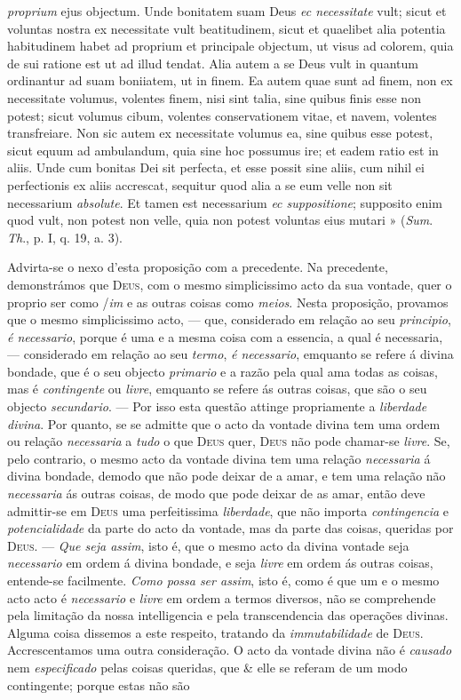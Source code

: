 \emph{proprium} ejus objectum. Unde bonitatem suam Deus \emph{ec necessitate} vult; sicut et voluntas nostra ex necessitate vult beatitudinem, sicut et quaelibet alia potentia habitudinem habet ad proprium et principale objectum, ut visus ad colorem, quia de sui ratione est ut ad illud tendat. Alia autem a se Deus vult in quantum ordinantur ad suam boniiatem, ut in finem. Ea autem quae sunt ad finem, non ex necessitate volumus, volentes finem, nisi sint talia, sine quibus finis esse non potest; sicut volumus cibum, volentes conservationem vitae, et navem, volentes transfreiare. Non sic autem ex necessitate volumus ea, sine quibus esse potest, sicut equum ad ambulandum, quia sine hoc possumus ire; et eadem ratio est in aliis. Unde cum bonitas Dei sit perfecta, et esse possit sine aliis, cum nihil ei perfectionis ex aliis accrescat, sequitur quod alia a se eum velle non sit necessarium \emph{absolute}. Et tamen est necessarium \emph{ec suppositione}; supposito enim quod vult, non potest non velle, quia non potest voluntas eius mutari » (\emph{Sum}. \emph{Th}., p. I, q. 19, a. 3).\par Advirta-se o nexo d'esta proposição com a precedente. Na precedente, demonstrámos que \textsc{Deus}, com o mesmo simplicissimo acto da sua vontade, quer o proprio ser como /\emph{im} e as outras coisas como \emph{meios}. Nesta proposição, provamos que o mesmo simplicissimo acto, --- que, considerado em relação ao seu \emph{principio}, \emph{é necessario}, porque é uma e a mesma coisa com a essencia, a qual é necessaria, --- considerado em relação ao seu \emph{termo}, \emph{é necessario}, emquanto se refere á divina bondade, que é o seu objecto \emph{primario} e a razão pela qual ama todas as coisas, mas é \emph{contingente} ou \emph{livre}, emquanto se refere ás outras coisas, que são o seu objecto \emph{secundario}. --- Por isso esta questão attinge propriamente a \emph{liberdade divina}. Por quanto, se se admitte que o acto da vontade divina tem uma ordem ou relação \emph{necessaria} a \emph{tudo} o que \textsc{Deus} quer, \textsc{Deus} não pode chamar-se \emph{livre}. Se, pelo contrario, o mesmo acto da vontade divina tem uma relação \emph{necessaria} á divina bondade, demodo que não pode deixar de a amar, e tem uma relação não \emph{necessaria} ás outras coisas, de modo que pode deixar de as amar, então deve admittir-se em \textsc{Deus} uma perfeitissima \emph{liberdade}, que não importa \emph{contingencia} e \emph{potencialidade} da parte do acto da vontade, mas da parte das coisas, queridas por \textsc{Deus}. --- \emph{Que seja assim}, isto é, que o mesmo acto da divina vontade seja \emph{necessario} em ordem á divina bondade, e seja \emph{livre} em ordem ás outras coisas, entende-se facilmente. \emph{Como possa ser assim}, isto é, como é que um e o mesmo acto acto é \emph{necessario} e \emph{livre} em ordem a termos diversos, não se comprehende pela limitação da nossa intelligencia e pela transcendencia das operações divinas. Alguma coisa dissemos a este respeito, tratando da \emph{immutabilidade} de \textsc{Deus}. Accrescentamos uma outra consideração. O acto da vontade divina não é \emph{causado} nem \emph{especificado} pelas coisas queridas, que \& elle se referam de um modo contingente; porque estas não são 